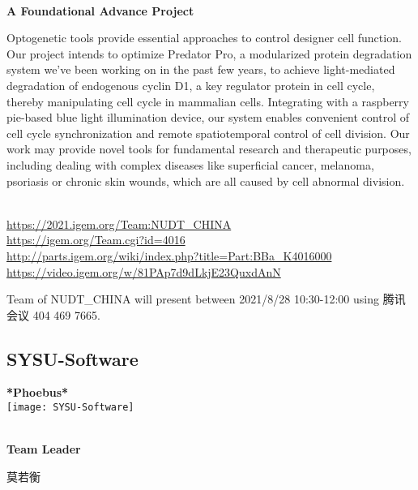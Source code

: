 \textbf{\\A Foundational Advance Project\\}\begin{spacing}{1.5}

Optogenetic tools provide essential approaches to control designer cell function. Our project intends to optimize Predator Pro, a modularized protein degradation system we’ve been working on in the past few years, to achieve light-mediated degradation of endogenous cyclin D1, a key regulator protein in cell cycle, thereby manipulating cell cycle in mammalian cells. Integrating with a raspberry pie-based blue light illumination device, our system enables convenient control of cell cycle synchronization and remote spatiotemporal control of cell division. Our work may provide novel tools for fundamental research and therapeutic purposes, including dealing with complex diseases like superficial cancer, melanoma, psoriasis or chronic skin wounds, which are all caused by cell abnormal division.\end{spacing}
\\

\url{https://2021.igem.org/Team:NUDT\_CHINA }\\
\url{https://igem.org/Team.cgi?id=4016 }\\
\url{http://parts.igem.org/wiki/index.php?title=Part:BBa_K4016000 }\\
\url{https://video.igem.org/w/81PAp7d9dLkjE23QuxdAnN }\\

\vfill{}









Team of NUDT\_CHINA will present between     2021/8/28 10:30-12:00    using 腾讯会议 404 469 7665.
\newpage


\subsection{\textcolor{Blu}{ SYSU-Software } }
\vspace{5mm}
\begin{center}
\large{
  \textbf{ *Phoebus* }\\
  \texttt{[image: SYSU-Software]}
}
\end{center}
\textbf{\\Team Leader}

  莫若衡


